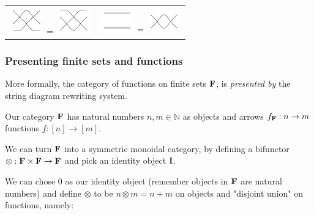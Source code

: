 \documentclass[t, pdftex]{beamer}
\begin{document}
\begin{frame}
\begin{table}[]
\begin{tabular}{cc}
            \includegraphics[valign=m, width=1.5cm]{figures/equations/e41.pdf} = 
            \includegraphics[valign=m, width=1.5cm]{figures/equations/e42.pdf} &
            \includegraphics[valign=m, width=1.5cm]{figures/equations/e71.pdf} = 
            \includegraphics[valign=m, width=1.5cm]{figures/equations/e72.pdf}

        \end{tabular}
    \end{table}
\end{frame}

\begin{frame}
    \frametitle{Presenting finite sets and functions}
    More formally, the category of functions on finite sets $\bf{F}$, is \textit{presented by} the string diagram rewriting system.
    \par
    Our category $\bf{F}$ has natural numbers $n,m \in \mathbb{N}$ as objects and arrows $f_{\bf{F}} : n \to m$ functions $f : [n] \to [m]$.
    \par
    We can turn $\bf{F}$ into a symmetric monoidal category, by defining a bifunctor $\otimes : \bf{F} \times \bf{F} \to \bf{F}$ and pick an identity object $\bf{I}$.
    \par
    We can chose $\mathrm{0}$ as our identity object (remember objects in $\bf{F}$ are natural numbers) and define $\otimes$ to be $n \otimes m = n + m$ on objects and "disjoint union" on functions, namely:
\end{frame}
\end{document}
